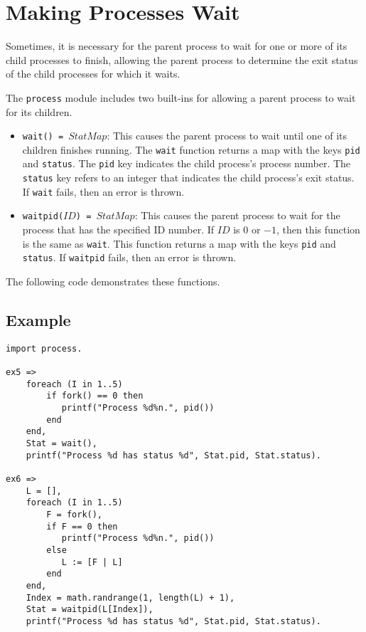 \section{Making Processes Wait}
Sometimes, it is necessary for the parent process to wait for one or more of its child processes to finish, allowing the parent process to determine the exit status of the child processes for which it waits.

The \texttt{process} module includes two built-ins for allowing a parent process to wait for its children.
\begin{itemize}
\item \texttt{wait() = $StatMap$}: This causes the parent process to wait until one of its children finishes running.  The \texttt{wait} function returns a map with the keys \texttt{pid} and \texttt{status}.  The \texttt{pid} key indicates the child process's process number.  The \texttt{status} key refers to an integer that indicates the child process's exit status.  If \texttt{wait} fails, then an error is thrown.
\item \texttt{waitpid($ID$) = $StatMap$}: This causes the parent process to wait for the process that has the specified ID number.  If $ID$ is $0$ or $-1$, then this function is the same as \texttt{wait}.  This function returns a map with the keys \texttt{pid} and \texttt{status}.  If \texttt{waitpid} fails, then an error is thrown.
\end{itemize}

The following code demonstrates these functions.

\subsection*{Example}
\begin{verbatim}
import process.

ex5 =>
    foreach (I in 1..5)
        if fork() == 0 then
           printf("Process %d%n.", pid())
        end
    end,
    Stat = wait(),
    printf("Process %d has status %d", Stat.pid, Stat.status).

ex6 =>
    L = [],
    foreach (I in 1..5)
        F = fork(),
        if F == 0 then
           printf("Process %d%n.", pid())
        else
           L := [F | L]
        end
    end,
    Index = math.randrange(1, length(L) + 1),
    Stat = waitpid(L[Index]),
    printf("Process %d has status %d", Stat.pid, Stat.status).
\end{verbatim}

